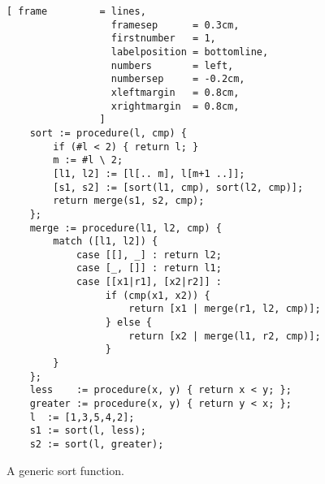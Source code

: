 \begin{figure}[!ht]
\centering
\begin{Verbatim}[ frame         = lines, 
                  framesep      = 0.3cm, 
                  firstnumber   = 1,
                  labelposition = bottomline,
                  numbers       = left,
                  numbersep     = -0.2cm,
                  xleftmargin   = 0.8cm,
                  xrightmargin  = 0.8cm,
                ]
    sort := procedure(l, cmp) {
        if (#l < 2) { return l; }
        m := #l \ 2;
        [l1, l2] := [l[.. m], l[m+1 ..]];
        [s1, s2] := [sort(l1, cmp), sort(l2, cmp)];
        return merge(s1, s2, cmp);
    };
    merge := procedure(l1, l2, cmp) {
        match ([l1, l2]) {
            case [[], _] : return l2;
            case [_, []] : return l1;
            case [[x1|r1], [x2|r2]] : 
                 if (cmp(x1, x2)) {
                     return [x1 | merge(r1, l2, cmp)];
                 } else {
                     return [x2 | merge(l1, r2, cmp)];
                 }
        }
    };
    less    := procedure(x, y) { return x < y; };
    greater := procedure(x, y) { return y < x; };
    l  := [1,3,5,4,2];    
    s1 := sort(l, less);
    s2 := sort(l, greater);
\end{Verbatim}
\vspace*{-0.3cm}
\caption{A generic sort function.}
\label{fig:merge-sort.stlx}
\end{figure}

